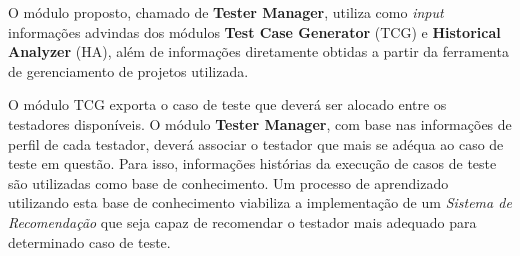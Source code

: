 O módulo proposto, chamado de \textbf{Tester Manager}, utiliza como \textit{input} informações advindas dos módulos \textbf{Test Case Generator} (TCG) e \textbf{Historical Analyzer} (HA), além de informações diretamente obtidas a partir da ferramenta de gerenciamento de projetos utilizada.

O módulo TCG exporta o caso de teste que deverá ser alocado entre os testadores disponíveis. O módulo \textbf{Tester Manager}, com base nas informações de perfil de cada testador, deverá associar o testador que mais se adéqua ao caso de teste em questão. Para isso, informações histórias da execução de casos de teste são utilizadas como base de conhecimento. Um processo de aprendizado utilizando esta base de conhecimento viabiliza a implementação de um \textit{Sistema de Recomendação} que seja capaz de recomendar o testador mais adequado para determinado caso de teste.
